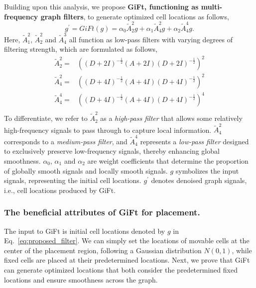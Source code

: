 Building upon this analysis, we propose \textbf{GiFt, functioning as multi-frequency graph filters}, to generate optimized cell locations as follows, 
\begin{equation}\label{eq:proposed_filter}
g^{\prime}=GiFt(g)=\alpha_0\tilde{A}_2^2g+\alpha_1\tilde{A}_4^2g+\alpha_2\tilde{A}_4^4g.
\end{equation}
Here, $\tilde{A}_1^2$, $\tilde{A}_2^2$ and $\tilde{A}_4^3$ all function as low-pass filters with varying degrees of filtering strength, which are formulated as follows,
\begin{equation}\label{eq:A_formulation}
\begin{aligned}
    \tilde{A}_2^2=&{((D+2I)^{-\frac{1}{2}}(A+2I)(D+2I)^{-\frac{1}{2}})}^2 \\
    \tilde{A}_4^2=&{((D+4I)^{-\frac{1}{2}}(A+4I)(D+4I)^{-\frac{1}{2}})}^2 \\
    \tilde{A}_4^4=&{((D+4I)^{-\frac{1}{2}}(A+4I)(D+4I)^{-\frac{1}{2}})}^4 \\
\end{aligned}
\end{equation}
To differentiate, we refer to $\tilde{A}_2^2$ as a \emph{high-pass filter} that allows some relatively high-frequency signals to pass through to capture local information. $\tilde{A}_4^2$ corresponds to a \emph{medium-pass filter}, and $\tilde{A}_4^4$ represents a \emph{low-pass filter} designed to exclusively preserve low-frequency signals, thereby enhancing global smoothness.
$\alpha_0$, $\alpha_1$ and $\alpha_2$ are weight coefficients that determine the proportion of globally smooth signals and locally smooth signals.
$g$ symbolizes the input signals, representing the initial cell locations.
$g^{\prime}$ denotes denoised graph signals, i.e., cell locations produced by GiFt.

\subsubsection{The beneficial attributes of GiFt for placement.}
The input to GiFt is initial cell locations denoted by $g$ in Eq.~\ref{eq:proposed_filter}. We can simply set the locations of movable cells at the center of the placement region, following a Gaussian distribution $N(0,1)$, while fixed cells are placed at their predetermined locations. 
Next, we prove that GiFt can generate optimized locations that both consider the predetermined fixed locations and ensure smoothness across the graph.

